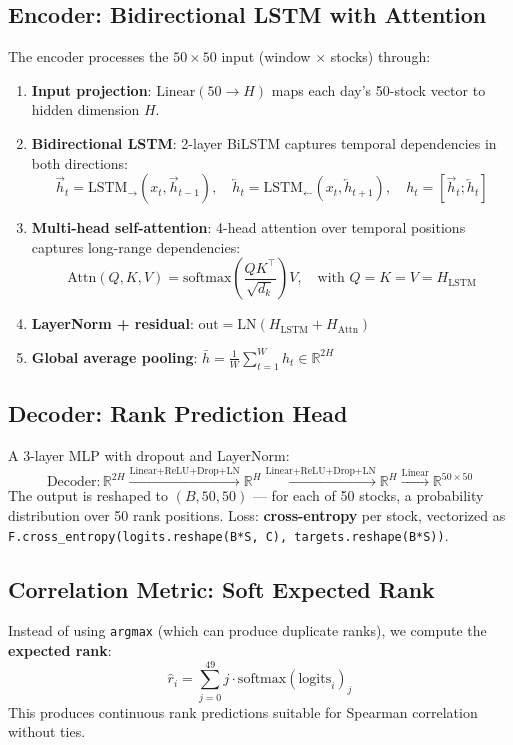\documentclass[11pt,a4paper]{article}
\begin{document}
\subsection{Encoder: Bidirectional LSTM with Attention}
The encoder processes the $50 \times 50$ input (window $\times$ stocks) through:
\begin{enumerate}[nosep]
  \item \textbf{Input projection}: $\text{Linear}(50 \to H)$ maps each day's 50-stock vector to hidden dimension $H$.
  \item \textbf{Bidirectional LSTM}: 2-layer BiLSTM captures temporal dependencies in both directions:
  \begin{equation}
    \vec{h}_t = \text{LSTM}_{\rightarrow}(x_t, \vec{h}_{t-1}), \quad \overleftarrow{h}_t = \text{LSTM}_{\leftarrow}(x_t, \overleftarrow{h}_{t+1}), \quad h_t = [\vec{h}_t; \overleftarrow{h}_t]
  \end{equation}
  \item \textbf{Multi-head self-attention}: 4-head attention over temporal positions captures long-range dependencies:
  \begin{equation}
    \text{Attn}(Q,K,V) = \text{softmax}\!\left(\frac{QK^\top}{\sqrt{d_k}}\right)V, \quad \text{with } Q=K=V=H_{\text{LSTM}}
  \end{equation}
  \item \textbf{LayerNorm + residual}: $\text{out} = \text{LN}(H_{\text{LSTM}} + H_{\text{Attn}})$
  \item \textbf{Global average pooling}: $\bar{h} = \frac{1}{W}\sum_{t=1}^{W} h_t \in \mathbb{R}^{2H}$
\end{enumerate}

\subsection{Decoder: Rank Prediction Head}
A 3-layer MLP with dropout and LayerNorm:
\begin{equation}
  \text{Decoder}: \mathbb{R}^{2H} \xrightarrow{\text{Linear+ReLU+Drop+LN}} \mathbb{R}^{H} \xrightarrow{\text{Linear+ReLU+Drop+LN}} \mathbb{R}^{H} \xrightarrow{\text{Linear}} \mathbb{R}^{50 \times 50}
\end{equation}
The output is reshaped to $(B, 50, 50)$ --- for each of 50 stocks, a probability distribution over 50 rank positions. Loss: \textbf{cross-entropy} per stock, vectorized as \texttt{F.cross\_entropy(logits.reshape(B*S, C), targets.reshape(B*S))}.

\subsection{Correlation Metric: Soft Expected Rank}
Instead of using \texttt{argmax} (which can produce duplicate ranks), we compute the \textbf{expected rank}:
\begin{equation}
  \hat{r}_i = \sum_{j=0}^{49} j \cdot \text{softmax}(\text{logits}_i)_j
\end{equation}
This produces continuous rank predictions suitable for Spearman correlation without ties.
\end{document}
